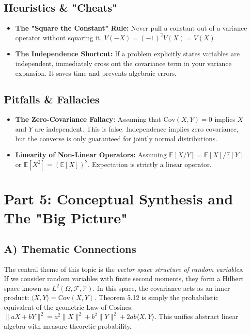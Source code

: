 \documentclass[11pt, a4paper]{article}
\theoremstyle{definition}
\theoremstyle{remark}
\newcommand{\E}{\mathbb{E}}
\newcommand{\Prob}{\mathbb{P}}
\newcommand{\F}{\mathcal{F}}
\begin{document}
\subsection{Heuristics \& "Cheats"}
\begin{itemize}
    \item \textbf{The "Square the Constant" Rule:} Never pull a constant out of a variance operator without squaring it. $V(-X) = (-1)^2 V(X) = V(X)$.
    \item \textbf{The Independence Shortcut:} If a problem explicitly states variables are independent, immediately cross out the covariance term in your variance expansion. It saves time and prevents algebraic errors.
\end{itemize}

\subsection{Pitfalls \& Fallacies}
\begin{itemize}
    \item \textbf{The Zero-Covariance Fallacy:} Assuming that $\text{Cov}(X,Y) = 0$ implies $X$ and $Y$ are independent. This is false. Independence implies zero covariance, but the converse is only guaranteed for jointly normal distributions.
    \item \textbf{Linearity of Non-Linear Operators:} Assuming $\E[X/Y] = \E[X]/\E[Y]$ or $\E[X^2] = (\E[X])^2$. Expectation is strictly a linear operator.
\end{itemize}

\newpage
\section{Part 5: Conceptual Synthesis and The "Big Picture"}

\subsection{A) Thematic Connections}
The central theme of this topic is the \textit{vector space structure of random variables}. If we consider random variables with finite second moments, they form a Hilbert space known as $L^2(\Omega, \F, \Prob)$. In this space, the covariance acts as an inner product: $\langle X, Y \rangle = \text{Cov}(X, Y)$. 
Theorem 5.12 is simply the probabilistic equivalent of the geometric Law of Cosines: $\|aX + bY\|^2 = a^2\|X\|^2 + b^2\|Y\|^2 + 2ab\langle X, Y \rangle$. This unifies abstract linear algebra with measure-theoretic probability.
\end{document}
